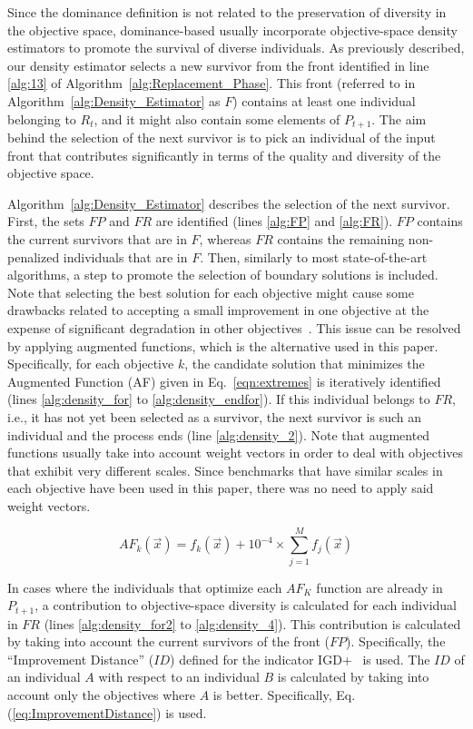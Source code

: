 Since the dominance definition is not related to the preservation of diversity in the objective space,
dominance-based \MOEAS{} usually incorporate objective-space density estimators to promote the survival
of diverse individuals.
%
As previously described, our density estimator selects a new survivor from the front identified
in line \ref{alg:13} of Algorithm~\ref{alg:Replacement_Phase}.
%
This front (referred to in Algorithm~\ref{alg:Density_Estimator}  as $F$) contains at least one individual belonging to $R_t$, and it might also contain some elements 
of $P_{t+1}$.
%
The aim behind the selection of the next survivor is to pick an individual of the input front
that contributes significantly in terms of the quality and diversity of the objective space. %

Algorithm~\ref{alg:Density_Estimator} describes the selection of the next survivor.
%
First, the sets $FP$ and $FR$ are identified (lines \ref{alg:FP} and \ref{alg:FR}).
%
$FP$ contains the current survivors that are in $F$, whereas $FR$ contains
the remaining non-penalized individuals that are in $F$.
%
Then, similarly to most state-of-the-art algorithms, a step to promote the selection of boundary solutions
is included.
%
Note that selecting the best solution for each objective might cause some drawbacks related to accepting a small improvement
in one objective at the expense of significant degradation in other objectives~\cite{deb2016optimality}.
%
This issue can be resolved by applying augmented functions, which is the alternative used in this paper.
%
Specifically, for each objective $k$, the candidate solution that minimizes the Augmented Function (AF)
given in Eq.~\ref{eqn:extremes} is iteratively identified (lines \ref{alg:density_for} to \ref{alg:density_endfor}).
%
If this individual belongs to $FR$, i.e., it has not yet been selected as a survivor, the next survivor is such an individual
and the process ends (line \ref{alg:density_2}).
%
Note that augmented functions usually take into account weight vectors in order to deal with objectives
that exhibit very different scales.
%
Since benchmarks that have similar scales in each objective have been used in this paper, there was no need to apply
said weight vectors.

\begin{equation}\label{eqn:extremes}
AF_k (\vec{x}) = f_k(\vec{x}) + 10^{-4} \times  \sum_{j=1}^M f_j( \vec{x} )
\end{equation}

In cases where the individuals that optimize each $AF_K$ function are already in $P_{t+1}$, a contribution
to objective-space diversity is calculated for each individual in $FR$ (lines \ref{alg:density_for2} to \ref{alg:density_4}).
%
This contribution is calculated by taking into account the current survivors of the front ($FP$).
%
Specifically, the ``Improvement Distance'' ($ID$) defined for the indicator IGD+~\cite{Joel:Inverted_Generational_Distance_Plus}
is used.
%
The $ID$ of an individual $A$ with respect to an individual $B$ is calculated by taking into account only the objectives
where $A$ is better.
%
Specifically, Eq. (\ref{eq:ImprovementDistance}) is used.

